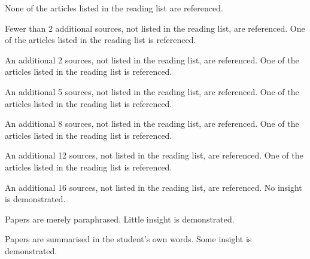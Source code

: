 \documentclass{../../fal_assignment}
\begin{document}
\begin{markingrubric}
%
%
        \grade\fail	None of the articles listed in the reading list are referenced.
        \par		Fewer than 2 additional sources, not listed in the reading list, are referenced.
        \grade		One of the articles listed in the reading list is referenced.
        \par		An additional 2 sources, not listed in the reading list, are referenced.
        \grade		One of the articles listed in the reading list is referenced.
        \par		An additional 5 sources, not listed in the reading list, are referenced.
        \grade		One of the articles listed in the reading list is referenced.
        \par		An additional 8 sources, not listed in the reading list, are referenced.
        \grade		One of the articles listed in the reading list is referenced.
        \par		An additional 12 sources, not listed in the reading list, are referenced.
        \grade		One of the articles listed in the reading list is referenced.
        \par		An additional 16 sources, not listed in the reading list, are referenced.
%
        \grade\fail No insight is demonstrated.
        \par		Papers are merely paraphrased.
        \grade		Little insight is demonstrated.
        \par		Papers are summarised in the student's own words.
        \grade		Some insight is demonstrated.

\end{markingrubric}
\end{document}
